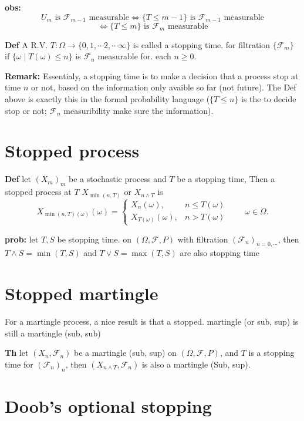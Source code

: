 \documentclass[
  letterpaper,
  DIV=11,
  numbers=noendperiod]{scrreprt}
\theoremstyle{definition}
\theoremstyle{plain}
\theoremstyle{plain}
\theoremstyle{definition}
\theoremstyle{plain}
\theoremstyle{plain}
\theoremstyle{remark}
\begin{document}
\textbf{obs:} \[
U_m \text{ is } \mathcal{F}_{m-1} \text{ measurable} \iff \{T \leq m-1\} \text{ is } \mathcal{F}_{m-1} \text{ measurable}
\] \[
\iff \{T \leq m\} \text{ is } \mathcal{F}_m \text{ measurable}
\]

\textbf{Def} A R.V. \(T : \Omega \to \{0, 1, \cdots 2, \cdots \infty\}\)
is called a stopping time. for filtration \(\{\mathcal{F}_m\}\) if
\(\{\omega \mid T(\omega) \leq n\}\) is \(\mathcal{F}_n\) measurable
for. each \(n \geq 0\).

\textbf{Remark:} Essentialy, a stopping time is to make a decision that
a process stop at time \(n\) or not, based on the information only
avaible so far (not future). The Def above is exactly this in the formal
probability language (\(\{T \leq n\}\) is the to decide stop or not;
\(\mathcal{F}_n\) measuribility make sure the information).

\section{Stopped process}\label{stopped-process}

\textbf{Def} let \((X_m)_m\) be a stochastic process and \(T\) be a
stopping time, Then a stopped process at \(T\) \(X_{\min(n,T)}\) or
\(X_{n \wedge T}\) is \[
X_{\min(n,T)(\omega)}(\omega) = \begin{cases} X_n(\omega), & n \leq T(\omega) \\ X_{T(\omega)}(\omega), & n > T(\omega) \end{cases} \qquad \omega \in \Omega.
\]

\textbf{prob:} let \(T, S\) be stopping time. on
\((\Omega, \mathcal{F}, P)\) with filtration
\((\mathcal{F}_n)_{n=0,\cdots}\), then \(T \wedge S = \min(T, S)\) and
\(T \vee S = \max(T, S)\) are also stopping time

\section{Stopped martingle}\label{stopped-martingle}

For a martingle process, a nice result is that a stopped. martingle (or
sub, sup) is still a martingle (sub, sub)

\textbf{Th} let \((X_n, \mathcal{F}_n)\) be a martingle (sub, sup) on
\((\Omega, \mathcal{F}, P)\), and \(T\) is a stopping time for
\((\mathcal{F}_n)_n\), then \((X_{n \wedge T}, \mathcal{F}_n)\) is also
a martingle (Sub, sup).

\section{Doob's optional stopping}\label{doobs-optional-stopping}
\end{document}
